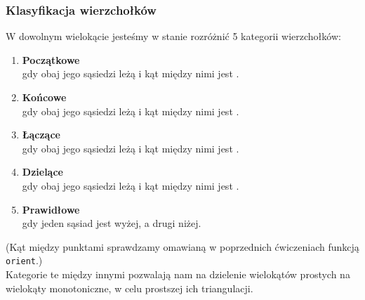 \documentclass[11pt,a4paper]{article}
\begin{document}
\subsubsection{Klasyfikacja wierzchołków}
W dowolnym wielokącie jesteśmy w stanie rozróżnić
5 kategorii wierzchołków:
\begin{enumerate}
    \item \textbf{Początkowe}
    \\gdy obaj jego sąsiedzi leżą  i kąt między nimi
    jest .
    \item \textbf{Końcowe}
    \\gdy obaj jego sąsiedzi leżą  i kąt między nimi
    jest .
    \item \textbf{Łączące}
    \\gdy obaj jego sąsiedzi leżą  i kąt między nimi
    jest .
    \item \textbf{Dzielące}
    \\gdy obaj jego sąsiedzi leżą  i kąt między nimi
    jest .
    \item \textbf{Prawidłowe}
    \\gdy jeden sąsiad jest wyżej, a drugi niżej.
\end{enumerate} 
\footnotesize (Kąt między punktami sprawdzamy omawianą w poprzednich
ćwiczeniach funkcją \verb|orient|.)
\\


\normalsize
Kategorie te między innymi pozwalają nam na dzielenie wielokątów
prostych na wielokąty monotoniczne, w celu prostszej ich triangulacji.

\pagebreak
\end{document}
